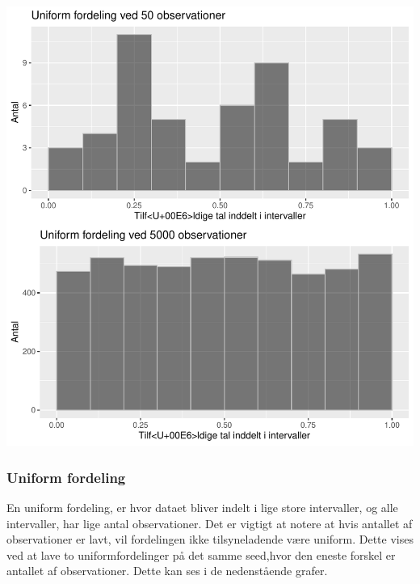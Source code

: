 \documentclass[
]{article}
\begin{document}
\includegraphics{TP2_files/figure-latex/unnamed-chunk-11-1.pdf}

\hypertarget{uniform-fordeling}{%
\subsubsection{Uniform fordeling}\label{uniform-fordeling}}

En uniform fordeling, er hvor dataet bliver indelt i lige store
intervaller, og alle intervaller, har lige antal observationer. Det er
vigtigt at notere at hvis antallet af observationer er lavt, vil
fordelingen ikke tilsyneladende være uniform. Dette vises ved at lave to
uniformfordelinger på det samme seed,hvor den eneste forskel er antallet
af observationer. Dette kan ses i de nedenstående grafer.
\end{document}
